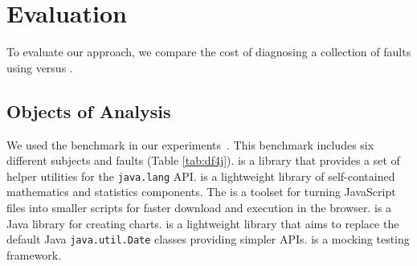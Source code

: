 \documentclass{article}
\begin{document}
%


\section{Evaluation}
\label{sec:eval}

To evaluate our approach, we compare the cost of diagnosing
a collection of faults using \sfl{} versus \comb{}.

\subsection{Objects of Analysis}\label{sec:analysis}

We used the \dfj{} benchmark in our
experiments~\cite{just-defects4j-issta2014}. This benchmark includes
six different subjects and \numFaults{} faults (Table \ref{tab:df4j}).
\lang{} is a library that provides a set of helper utilities for the
     {\small\texttt{java.lang}} API. \cmath{} is a lightweight library
     of self-contained mathematics and statistics components. The
     \closure{} is a toolset for turning JavaScript files into smaller
     scripts for faster download and execution in the
     browser. \chart{} is a Java library for creating charts. \jtime{}
     is a lightweight library that aims to replace the default Java
     {\small\texttt{java.util.Date}} classes providing simpler
     APIs. \mockito{} is a mocking testing framework.
\end{document}
